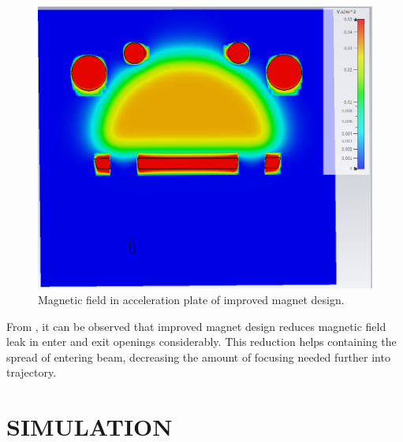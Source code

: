 \documentclass[a4paper,oneside,12pt]{report}
\numberwithin{equation}{chapter}
\begin{document}
\begin{figure}[H]
    \centering
    \captionsetup{justification=centering}
    \includegraphics[width=.8\linewidth]{./figures/cst/cst_second_magnet_design4.png}
    \caption{Magnetic field in acceleration plate of improved magnet design.}
    \label{fig:improved_magnet_design_B}
\end{figure}


From , it can be observed that improved magnet design reduces magnetic field leak in enter and exit openings considerably. 
This reduction helps containing the spread of entering beam, decreasing the amount of focusing needed further into trajectory. 




\newpage


\chapter{SIMULATION}
\newpage



\newpage


\appendix
\end{document}
